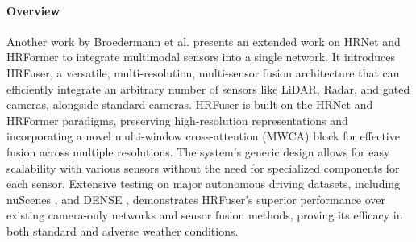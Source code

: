 \documentclass[report.tex]{subfiles}
\begin{document}
    
    \paragraph*{Overview}

    Another work by Broedermann et al. \cite{broedermann2022hrfuser} presents an extended work on HRNet \cite{wang2020hrnet} and HRFormer \cite{yuan2021hrformer} to integrate multimodal sensors into a single network. It introduces HRFuser, a versatile, multi-resolution, multi-sensor fusion architecture that can efficiently integrate an arbitrary number of sensors like LiDAR, Radar, and gated cameras, alongside standard cameras. HRFuser is built on the HRNet and HRFormer paradigms, preserving high-resolution representations and incorporating a novel multi-window cross-attention (MWCA) block for effective fusion across multiple resolutions. The system's generic design allows for easy scalability with various sensors without the need for specialized components for each sensor. Extensive testing on major autonomous driving datasets, including nuScenes \cite{caesar2020nuscenes}, and DENSE \cite{bijelic2020seeing}, demonstrates HRFuser's superior performance over existing camera-only networks and sensor fusion methods, proving its efficacy in both standard and adverse weather conditions.
\end{document}
